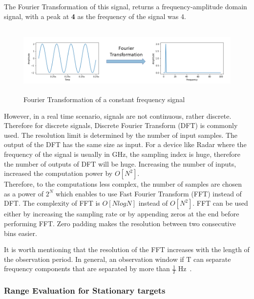The Fourier Transformation of this signal, returns a frequency-amplitude domain signal, with a peak at \textbf{4} as the frequency of the signal was 4.

 \begin{figure}[ht]
  \begin{center}
    \includegraphics[width=1\textwidth, height = 3.5cm ]{Master's thesis/images/fft.png} 
    \caption{Fourier Transformation of a constant frequency signal}
    \label{fig:fft}
  \end{center}
\end{figure}  

However, in a real time scenario, signals are not continuous, rather discrete. Therefore for discrete signals, Discrete Fourier Transform (DFT) is commonly used. The resolution limit is determined by the number of input samples.
The output of the DFT has the same size as input. For a device like Radar where the frequency of the signal is usually in GHz, the sampling index is huge, therefore the number of outputs of DFT will be huge. Increasing the number of inputs, increased the computation power by $O[N^2]$.
\\

Therefore, to the computations less complex, the number of samples are chosen as a power of $2^N$ which enables to use Fast Fourier Transform (FFT) instead of DFT. The complexity of FFT is $O[NlogN]$ instead of $O[N^2]$. FFT can be used either by increasing the sampling rate or by appending zeros at the end before performing FFT. Zero padding makes the resolution between two consecutive bins easier.

It is worth mentioning that the resolution of the FFT increases with the length of the observation period. In general, an observation window if T can separate frequency components that are separated by more than $\frac{1}{T}$ Hz~\cite{rao_2017}.


\subsubsection{Range Evaluation for Stationary targets}\label{sec:rangeEval}


